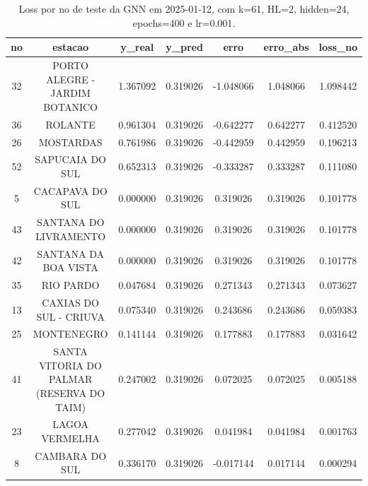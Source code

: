 \begin{table}[h]
\centering
\caption{Loss por no de teste da GNN em 2025-01-12, com k=61, HL=2, hidden=24, epochs=400 e lr=0.001.}
\label{tab:gnn_loss_k61_hl2_h24_e400_d20250112}
\begin{tabular}{ccccccc}
\toprule
no & estacao & y\_real & y\_pred & erro & erro\_abs & loss\_no \\
\midrule
32 & PORTO ALEGRE - JARDIM BOTANICO & 1.367092 & 0.319026 & -1.048066 & 1.048066 & 1.098442 \\
36 & ROLANTE & 0.961304 & 0.319026 & -0.642277 & 0.642277 & 0.412520 \\
26 & MOSTARDAS & 0.761986 & 0.319026 & -0.442959 & 0.442959 & 0.196213 \\
52 & SAPUCAIA DO SUL & 0.652313 & 0.319026 & -0.333287 & 0.333287 & 0.111080 \\
5 & CACAPAVA DO SUL & 0.000000 & 0.319026 & 0.319026 & 0.319026 & 0.101778 \\
43 & SANTANA DO LIVRAMENTO & 0.000000 & 0.319026 & 0.319026 & 0.319026 & 0.101778 \\
42 & SANTANA DA BOA VISTA & 0.000000 & 0.319026 & 0.319026 & 0.319026 & 0.101778 \\
35 & RIO PARDO & 0.047684 & 0.319026 & 0.271343 & 0.271343 & 0.073627 \\
13 & CAXIAS DO SUL - CRIUVA & 0.075340 & 0.319026 & 0.243686 & 0.243686 & 0.059383 \\
25 & MONTENEGRO & 0.141144 & 0.319026 & 0.177883 & 0.177883 & 0.031642 \\
41 & SANTA VITORIA DO PALMAR (RESERVA DO TAIM) & 0.247002 & 0.319026 & 0.072025 & 0.072025 & 0.005188 \\
23 & LAGOA VERMELHA & 0.277042 & 0.319026 & 0.041984 & 0.041984 & 0.001763 \\
8 & CAMBARA DO SUL & 0.336170 & 0.319026 & -0.017144 & 0.017144 & 0.000294 \\
\bottomrule
\end{tabular}
\end{table}
